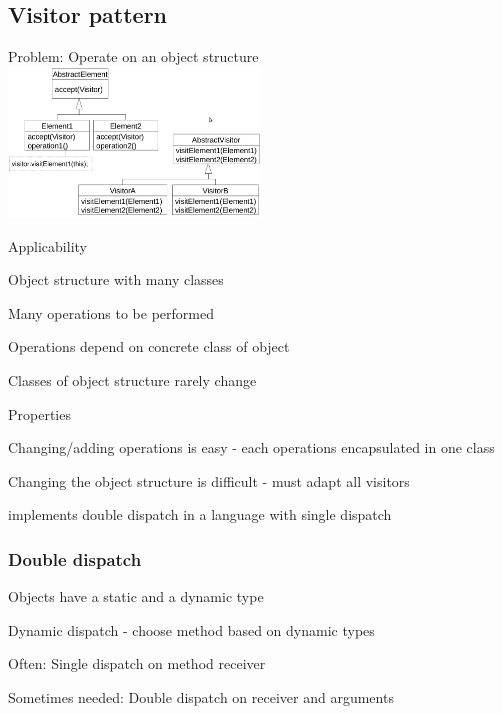 \documentclass[10pt]{article}
\begin{document}
\subsection{Visitor pattern}
\enumstart
	\item Problem: Operate on an object structure
	\\ \includegraphics[width=0.5\textwidth]{visitor_pattern.png}
	\item Applicability
	\enumstart
		\item Object structure with many classes
		\item Many operations to be performed
		\item Operations depend on concrete class of object
		\item Classes of object structure rarely change
	\enumend
	\item Properties
	\enumstart
		\item Changing/adding operations is easy - each operations encapsulated in one class
		\item Changing the object structure is difficult - must adapt all visitors
		\item implements double dispatch in a language with single dispatch
	\enumend
\enumend

\subsubsection{Double dispatch}
\enumstart
	\item Objects have a static and a dynamic type
	\item Dynamic dispatch - choose method based on dynamic types
	\item Often: Single dispatch on method receiver
	\item Sometimes needed: Double dispatch on receiver and arguments
\enumend
\end{document}
